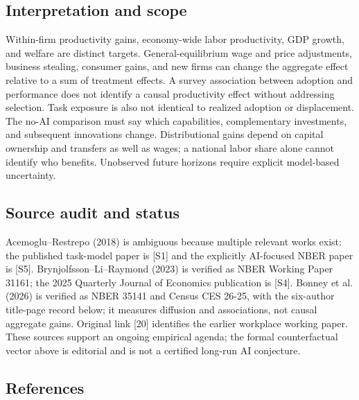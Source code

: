 \documentclass[11pt,a4paper]{article}
\begin{document}
\subsection*{Interpretation and scope}

Within-firm productivity gains, economy-wide labor productivity, GDP growth, and welfare are distinct targets. General-equilibrium wage and price adjustments, business stealing, consumer gains, and new firms can change the aggregate effect relative to a sum of treatment effects. A survey association between adoption and performance does not identify a causal productivity effect without addressing selection. Task exposure is also not identical to realized adoption or displacement. The no-AI comparison must say which capabilities, complementary investments, and subsequent innovations change. Distributional gains depend on capital ownership and transfers as well as wages; a national labor share alone cannot identify who benefits. Unobserved future horizons require explicit model-based uncertainty.

\subsection*{Source audit and status}

Acemoglu--Restrepo (2018) is ambiguous because multiple relevant works exist: the published task-model paper is [S1] and the explicitly AI-focused NBER paper is [S5]. Brynjolfsson--Li--Raymond (2023) is verified as NBER Working Paper 31161; the 2025 Quarterly Journal of Economics publication is [S4]. Bonney et al. (2026) is verified as NBER 35141 and Census CES 26-25, with the six-author title-page record below; it measures diffusion and associations, not causal aggregate gains. Original link [20] identifies the earlier workplace working paper. These sources support an ongoing empirical agenda; the formal counterfactual vector above is editorial and is not a certified long-run AI conjecture.

\subsection*{References}
\end{document}

